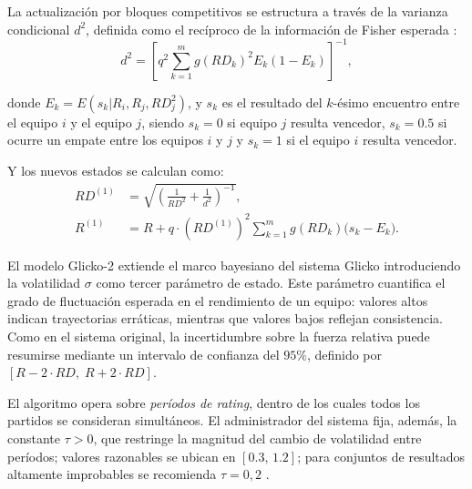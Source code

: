 La actualizaci\'on por bloques competitivos se estructura a trav\'es de la varianza condicional $d^2$, definida como el rec\'iproco de la informaci\'on de Fisher esperada \cite{Glickman1999}:
\begin{equation}
	d^2 = \left[q^2 \sum_{k=1}^{m} g(RD_k)^2 E_k (1 - E_k)\right]^{-1},
\end{equation}

donde $E_k=E\left(s_k|R_i,R_j,RD_j^2\right)$, y $s_k$ es el resultado del $k$-\'esimo encuentro entre el equipo $i$ y el equipo $j$, siendo $s_k=0$ si equipo $j$ resulta vencedor, $s_k=0.5$ si ocurre un empate entre los equipos $i$ y $j$ y $s_k=1$ si el equipo $i$ resulta vencedor.

Y los nuevos estados se calculan como:
\begin{align}
	RD^{(1)} &= \sqrt{\left(\frac{1}{RD^2} + \frac{1}{d^2}\right)^{-1}}, \\
	R^{(1)} &= R + q \cdot (RD^{(1)})^2 \sum_{k=1}^{m} g(RD_k)\bigl(s_k - E_k\bigr).
\end{align}

El modelo Glicko-2 \cite{Glickman2022} extiende el marco bayesiano del sistema Glicko introduciendo la volatilidad $\sigma$ como tercer par\'ametro de estado. Este par\'ametro cuantifica el grado de fluctuaci\'on esperada en el rendimiento de un equipo: valores altos indican trayectorias err\'aticas, mientras que valores bajos reflejan consistencia. Como en el sistema original, la incertidumbre sobre la fuerza relativa puede resumirse mediante un intervalo de confianza del $95\%$, definido por $[R-2\cdot RD,\; R+2\cdot RD]$.

El algoritmo opera sobre \emph{per\'iodos de rating}, dentro de los cuales todos los partidos se consideran simult\'aneos. El administrador del sistema fija, adem\'as, la constante $\tau>0$, que restringe la magnitud del cambio de volatilidad entre per\'iodos; valores razonables se ubican en $[0{.}3,\,1{.}2]$; para conjuntos de resultados altamente improbables se recomienda $\tau=0{,}2$ \cite{Glickman2022}.

